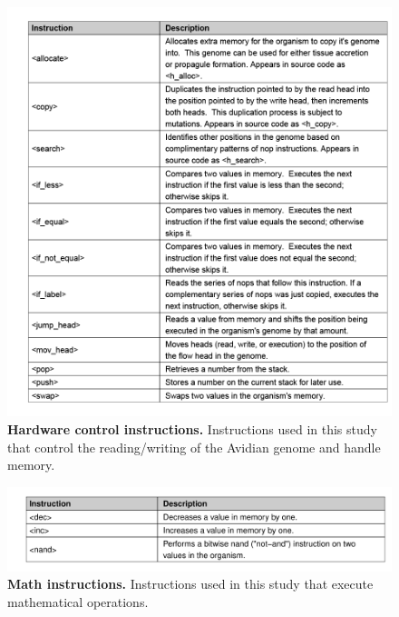 \documentclass[
]{book}
\begin{document}
\begin{figure}
\centering
\includegraphics{images/Avida_instructions_Hardware_control_Table.png}
\caption{\label{fig:Avida-instructions-Hardware-control-Table}\textbf{Hardware control instructions.} Instructions used in this study that control the reading/writing of the Avidian genome and handle memory.}
\end{figure}

\begin{figure}
\centering
\includegraphics{images/Avida_instructions_Math_Table.png}
\caption{\label{fig:Avida-instructions-Math-Table}\textbf{Math instructions.} Instructions used in this study that execute mathematical operations.}
\end{figure}
\end{document}
